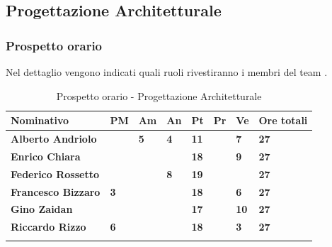 \subsection{Progettazione Architetturale}
\subsubsection{Prospetto orario}
Nel dettaglio vengono indicati quali ruoli rivestiranno i membri del team 
\GRUPPO.
\begin{center}
	\def\arraystretch{1.6}
	\bgroup
	\begin{longtable}{| p{4cm} | p{1cm} | p{1cm} | p{1cm} | p{1cm}| p{1cm} | 
			p{1cm} | p{1.7cm}|}
		\hline
		\textbf{Nominativo} & \textbf{PM} & \textbf{Am} & \textbf{An} & 
		\textbf{Pt} & \textbf{Pr} & \textbf{Ve} & \textbf{Ore totali}\\ 
		
		\hline \hline  
		
		\textbf{Alberto Andriolo} & \textbf{} & \textbf{5} & \textbf{4} & 
		\textbf{11} & \textbf{} & \textbf{7} & \textbf{27}\\ 
		\hline 
		
		\textbf{Enrico Chiara} & \textbf{} & \textbf{} & \textbf{} & 
		\textbf{18} & \textbf{} & \textbf{9} & \textbf{27}\\ 
		\hline 
		
		\textbf{Federico Rossetto} & \textbf{} & \textbf{} & \textbf{8} & 
		\textbf{19} & \textbf{} & \textbf{} & \textbf{27}\\ 
		\hline 
		
		\textbf{Francesco Bizzaro} & \textbf{3} & \textbf{} & \textbf{} & 
		\textbf{18} & \textbf{} & \textbf{6} & \textbf{27}\\ 
		\hline 
		
		\textbf{Gino Zaidan} & \textbf{} & \textbf{} & \textbf{} & 
		\textbf{17} & \textbf{} & \textbf{10} & \textbf{27}\\ 
		\hline 
		
		\textbf{Riccardo Rizzo} & \textbf{6} & \textbf{} & \textbf{} & 
		\textbf{18} & \textbf{} & \textbf{3} & \textbf{27}\\ 
		\hline 
		
		\hline 
		
		\caption{Prospetto orario - Progettazione Architetturale}
	\end{longtable}
	\egroup
\end{center}
